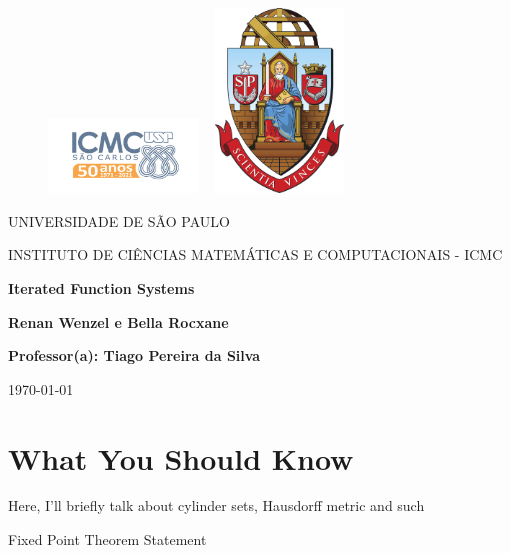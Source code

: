 \documentclass{article}
\begin{document}
\begin{figure}[ht]
	\includegraphics[width=4cm]{../icmc.png}
	\hspace{7cm}
	\includegraphics[height=4.9cm,width=4cm]{../brasao_usp_cor.jpg}
	\endminipage
\end{figure}

\begin{center}
	\vspace{1cm}
	\LARGE
	UNIVERSIDADE DE SÃO PAULO

	\vspace{1.3cm}
	\LARGE
	INSTITUTO DE CIÊNCIAS MATEMÁTICAS E COMPUTACIONAIS - ICMC

	\vspace{1.7cm}
	\Large
	\textbf{Iterated Function Systems}
	\large{}

	\vspace{1.3cm}
	\large
	\textbf{Renan Wenzel e Bella Rocxane}

	\vspace{1.3cm}
	\large
	\textbf{Professor(a): Tiago Pereira da Silva}

	\vspace{1.3cm}
	\today
\end{center}

\newpage

\tableofcontents

\newpage
\section{What You Should Know}
Here, I'll briefly talk about cylinder sets, Hausdorff metric and such

\hypertarget{fixed_point_theorem}{Fixed Point Theorem Statement}
\newpage
\end{document}
